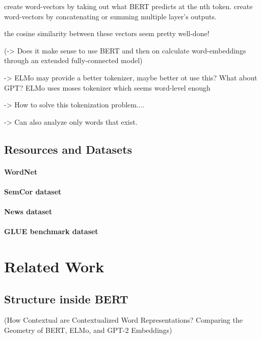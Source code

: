 \documentclass[a4paper,12pt,twoside,openright]{report}
\begin{document}
create word-vectors by taking out what BERT predicts at the nth token.
create word-vectors by concatenating or summing multiple layer's outputs.

the cosine similarity between these vectors seem pretty well-done!


(-> Does it make sense to use BERT and then on calculate word-embeddings through an extended fully-connected model)

-> ELMo may provide a better tokenizer, maybe better ot use this? What about GPT? ELMo uses moses tokenizer which seems word-level enough

-> How to solve this tokenization problem....

-> Can also analyze only words that exist.


\section{Resources and Datasets}

\subsubsection{WordNet}

\subsubsection{SemCor dataset}

\subsubsection{News dataset}

\subsubsection{GLUE benchmark dataset}







\chapter{Related Work}

\section{Structure inside BERT}

(How Contextual are Contextualized Word Representations? Comparing the Geometry of BERT, ELMo, and GPT-2 Embeddings)
\end{document}
